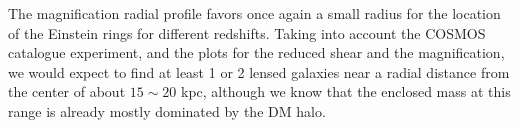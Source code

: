 The magnification radial profile favors once again a small radius for the location of the Einstein rings for different redshifts. Taking into account the COSMOS catalogue experiment, and the plots for the reduced shear and the magnification, we would expect to find at least 1 or 2 lensed galaxies near a radial distance from the center of about $15\sim 20$ kpc, although we know that the enclosed mass at this range is already mostly dominated by the DM halo. 


